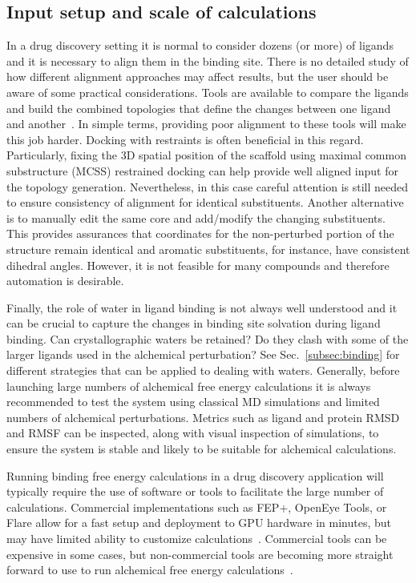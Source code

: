 \documentclass[9pt,bestpractices,pubversion]{livecoms}
\begin{document}
\subsection{Input setup and scale of calculations}
In a drug discovery setting it is normal to consider dozens (or more) of ligands and it is necessary to align them in the binding site. There is no detailed study of how different alignment approaches may affect results, but the user should be aware of some practical considerations. Tools are available to compare the ligands and build the combined topologies that define the changes between one ligand and another~\cite{loeffler2015fesetup,hedges2019biosimspace,gapsys2015pmx}. In simple terms, providing poor alignment to these tools will make this job harder. Docking with restraints is often beneficial in this regard. Particularly, fixing the 3D spatial position of the scaffold using maximal common substructure (MCSS) restrained docking can help provide well aligned input for the topology generation. Nevertheless, in this case careful attention is still needed to ensure consistency of alignment for identical substituents. Another alternative is to manually edit the same core and add/modify the changing substituents. This provides assurances that coordinates for the non-perturbed portion of the structure remain identical and aromatic substituents, for instance, have consistent dihedral angles. However, it is not feasible for many compounds and therefore automation is desirable. 

Finally, the role of water in ligand binding is not always well understood and it can be crucial to capture the changes in binding site solvation during ligand binding. Can crystallographic waters be retained? Do they clash with some of the larger ligands used in the alchemical perturbation? See Sec.~\ref{subsec:binding} for different strategies that can be applied to dealing with waters. Generally, before launching large numbers of alchemical free energy calculations it is always recommended to test the system using classical MD simulations and limited numbers of alchemical perturbations. Metrics such as ligand and protein RMSD and RMSF can be inspected, along with visual inspection of simulations, to ensure the system is stable and likely to be suitable for alchemical calculations. 

Running binding free energy calculations in a drug discovery application will typically require the use of software or tools to facilitate the large number of calculations. Commercial implementations such as FEP+, OpenEye Tools, or Flare allow for a fast setup and deployment to GPU hardware in minutes, but may have limited ability to customize calculations~\cite{wang2015accurate,kuhn2020assessment}. Commercial tools can be expensive in some cases, but non-commercial tools are becoming more straight forward to use to run alchemical free energy calculations~\cite{gapsys2015pmx, loeffler2015fesetup, song2019using, gapsys2020large, jespers2019qligfep, hedges2019biosimspace, kuhn2020assessment}.
\end{document}
